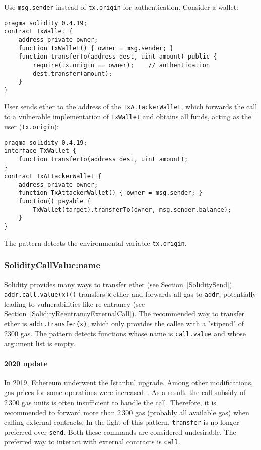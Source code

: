 Use \texttt{msg.sender} instead of \texttt{tx.origin} for authentication.
Consider a wallet:

\begin{lstlisting}[language=Solidity]
pragma solidity 0.4.19;
contract TxWallet {
    address private owner;
    function TxWallet() { owner = msg.sender; }
    function transferTo(address dest, uint amount) public {
        require(tx.origin == owner);	// authentication
        dest.transfer(amount);
    }
}
\end{lstlisting}

User sends ether to the address of the \texttt{TxAttackerWallet}, which forwards the call to a vulnerable implementation of \texttt{TxWallet} and obtains all funds, acting as the user (\texttt{tx.origin}):

\begin{lstlisting}[language=Solidity]
pragma solidity 0.4.19;
interface TxWallet {
    function transferTo(address dest, uint amount);
}
contract TxAttackerWallet {
    address private owner;
    function TxAttackerWallet() { owner = msg.sender; }
    function() payable {
        TxWallet(target).transferTo(owner, msg.sender.balance);
    }
}
\end{lstlisting}

The pattern detects the environmental variable \texttt{tx.origin}.

\subsubsection{\let\letcs\texapiletcs \usevalue SolidityCallValue:name \let\letcs\etoolboxletcs} \label{SolidityCallValue}

Solidity provides many ways to transfer ether (see Section~\ref{SoliditySend}).
\texttt{addr.call.value(x)()} transfers \texttt{x} ether and forwards all gas to \texttt{addr}, potentially leading to vulnerabilities like re-entrancy (see Section~\ref{SolidityReentrancyExternalCall}).
The recommended way to transfer ether is \texttt{addr.transfer(x)}, which only provides the callee with a "stipend" of 2300 gas.
The pattern detects functions whose name is \texttt{call.value} and whose argument list is empty.

\paragraph{2020 update}
In 2019, Ethereum underwent the Istanbul upgrade.
Among other modifications, gas prices for some operations were increased~\cite{EIP1884}.
As a result, the call subsidy of~$2\,300$ gas units is often insufficient to handle the call.
Therefore, it is recommended to forward more than $2\,300$ gas (probably all available gas) when calling external contracts.
In the light of this pattern, \texttt{transfer} is no longer preferred over \texttt{send}.
Both these commands are considered undesirable.
The preferred way to interact with external contracts is \texttt{call}.


